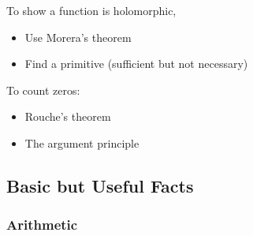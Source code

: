 \begin{fact}

To show a function is holomorphic,

\begin{itemize}
\tightlist
\item
  Use Morera's theorem
\item
  Find a primitive (sufficient but not necessary)
\end{itemize}

\end{fact}

\begin{fact}

To count zeros:

\begin{itemize}
\tightlist
\item
  Rouche's theorem
\item
  The argument principle
\end{itemize}

\end{fact}

\hypertarget{basic-but-useful-facts}{%
\subsection{Basic but Useful Facts}\label{basic-but-useful-facts}}

\hypertarget{arithmetic}{%
\subsubsection{Arithmetic}\label{arithmetic}}

